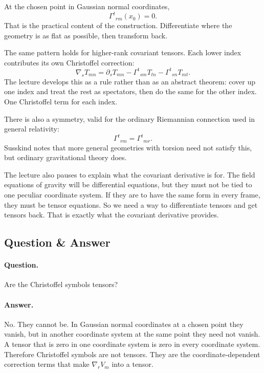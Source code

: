 At the chosen point in Gaussian normal coordinates,
\begin{equation}
\Gamma^{t}{}_{rm}(x_0)=0.
\end{equation}
That is the practical content of the construction. Differentiate where the geometry is as flat as possible, then transform back.

The same pattern holds for higher-rank covariant tensors. Each lower index contributes its own Christoffel correction:
\begin{equation}
\nabla_s T_{mn}
=
\partial_s T_{mn}
-\Gamma^{t}{}_{sm}T_{tn}
-\Gamma^{t}{}_{sn}T_{mt}.
\end{equation}
The lecture develops this as a rule rather than as an abstract theorem: cover up one index and treat the rest as spectators, then do the same for the other index. One Christoffel term for each index.

There is also a symmetry, valid for the ordinary Riemannian connection used in general relativity:
\begin{equation}
\Gamma^{t}{}_{rm}=\Gamma^{t}{}_{mr}.
\end{equation}
Susskind notes that more general geometries with torsion need not satisfy this, but ordinary gravitational theory does.

The lecture also pauses to explain what the covariant derivative is for. The field equations of gravity will be differential equations, but they must not be tied to one peculiar coordinate system. If they are to have the same form in every frame, they must be tensor equations. So we need a way to differentiate tensors and get tensors back. That is exactly what the covariant derivative provides.

\subsection{Question \& Answer}

\paragraph{Question.} Are the Christoffel symbols tensors?

\paragraph{Answer.} No. They cannot be. In Gaussian normal coordinates at a chosen point they vanish, but in another coordinate system at the same point they need not vanish. A tensor that is zero in one coordinate system is zero in every coordinate system. Therefore Christoffel symbols are not tensors. They are the coordinate-dependent correction terms that make \(\nabla_r V_m\) into a tensor.

